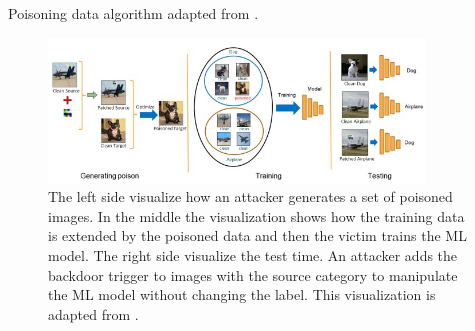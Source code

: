 \begin{algorithm}
  \caption{Poisoning data algorithm adapted from \cite{DBLP:journals/corr/abs-1910-00033}.}
  \label{alg:poisoning_hidden}
\end{algorithm}

\begin{figure}[ht!]
  \centering
  \includegraphics[width=10cm]{pictures/procedure_hidden_trigger.jpg}
  \caption{The left side visualize how an attacker generates a set of poisoned images. In the middle the visualization shows how the training data is extended by the poisoned data and then the victim trains the ML model. The right side visualize the test time. An attacker adds the backdoor trigger to images with the source category to manipulate the ML model without changing the label. This visualization is adapted from \cite{DBLP:journals/corr/abs-1910-00033}.}
  \label{fig:procedure_hidden_trigger}
\end{figure}

